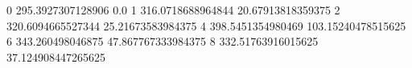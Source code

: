 0 295.3927307128906 0.0
1 316.0718688964844 20.67913818359375
2 320.6094665527344 25.21673583984375
4 398.5451354980469 103.15240478515625
6 343.260498046875 47.867767333984375
8 332.51763916015625 37.124908447265625
